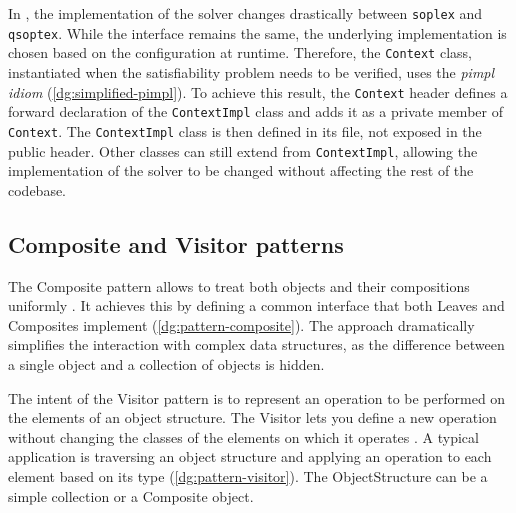 
In \dlinear, the implementation of the solver changes drastically between \texttt{soplex} and \texttt{qsoptex}.
While the interface remains the same, the underlying implementation is chosen based on the configuration at runtime.
Therefore, the \texttt{Context} class, instantiated when the satisfiability problem needs to be verified, uses the \textit{pimpl idiom} (\autoref{dg:simplified-pimpl}).
To achieve this result, the \texttt{Context} header defines a forward declaration of the \texttt{ContextImpl} class and adds it as a private member of \texttt{Context}.
The \texttt{ContextImpl} class is then defined in its file, not exposed in the public header.
Other classes can still extend from \texttt{ContextImpl}, allowing the implementation of the solver to be changed without affecting the rest of the codebase.


\subsection*{Composite and Visitor patterns}

The Composite pattern allows to treat both objects and their compositions uniformly \cite{book:gof}.
It achieves this by defining a common interface that both Leaves and Composites implement (\autoref{dg:pattern-composite}).
The approach dramatically simplifies the interaction with complex data structures, as the difference between a single object and a collection of objects is hidden.


The intent of the Visitor pattern is to represent an operation to be performed on the elements of an object structure.
The Visitor lets you define a new operation without changing the classes of the elements on which it operates \cite{book:gof}.
A typical application is traversing an object structure and applying an operation to each element based on its type (\autoref{dg:pattern-visitor}).
The ObjectStructure can be a simple collection or a Composite object.


